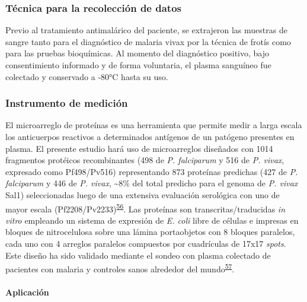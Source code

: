\documentclass[]{article}
\let\oldparagraph\paragraph
\renewcommand{\paragraph}[1]{\oldparagraph{#1}\mbox{}}
\begin{document}
\subsubsection{Técnica para la recolección de
datos}\label{tecnica-para-la-recoleccion-de-datos}

Previo al tratamiento antimalárico del paciente, se extrajeron las
muestras de sangre tanto para el diagnóstico de malaria vivax por la
técnica de frotís como para las pruebas bioquímicas. Al momento del
diagnóstico positivo, bajo consentimiento informado y de forma
voluntaria, el plasma sanguíneo fue colectado y conservado a -80°C hasta
su uso.

\subsubsection{Instrumento de medición}\label{instrumento-de-medicion}

El microarreglo de proteínas es una herramienta que permite medir a
larga escala los anticuerpos reactivos a determinados antígenos de un
patógeno presentes en plasma. El presente estudio hará uso de
microarreglos diseñados con 1014 fragmentos protéicos recombinantes (498
de \emph{P. falciparum} y 516 de \emph{P. vivax}, expresado como
Pf498/Pv516) representando 873 proteínas predichas (427 de \emph{P.
falciparum} y 446 de \emph{P. vivax}, \textasciitilde{}8\% del total
predicho para el genoma de \emph{P. vivax} Sal1) seleccionadas luego de
una extensiva evaluación serológica con uno de mayor escala
(Pf2208/Pv2233)\textsuperscript{\protect\hyperlink{ref-Finney2014}{56}}.
Las proteínas son transcritas/traducidas \emph{in vitro} empleando un
sistema de expresión de \emph{E. coli} libre de células e impresas en
bloques de nitrocelulosa sobre una lámina portaobjetos con 8 bloques
paralelos, cada uno con 4 arreglos paralelos compuestos por cuadrículas
de 17x17 \emph{spots}. Este diseño ha sido validado mediante el sondeo
con plasma colectado de pacientes con malaria y controles sanos
alrededor del
mundo\textsuperscript{\protect\hyperlink{ref-King2015FOC}{57}}.

\paragraph{Aplicación}\label{aplicacion}
\end{document}
